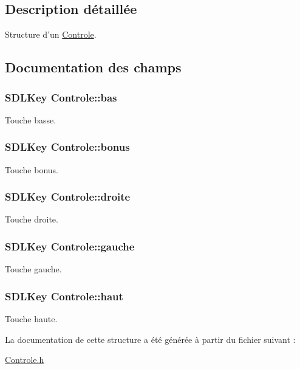 \subsection{Description détaillée}
Structure d'un \hyperlink{structControle}{Controle}. 

\subsection{Documentation des champs}
\hypertarget{structControle_a5b5c96bf02d58115b53eaa683f372faf}{
\subsubsection[{bas}]{\setlength{\rightskip}{0pt plus 5cm}S\-D\-L\-Key Controle\-::bas}}\label{structControle_a5b5c96bf02d58115b53eaa683f372faf}
Touche basse. \hypertarget{structControle_ad6ce9209cfccf9b61fbaf5bc149b64e9}{
\subsubsection[{bonus}]{\setlength{\rightskip}{0pt plus 5cm}S\-D\-L\-Key Controle\-::bonus}}\label{structControle_ad6ce9209cfccf9b61fbaf5bc149b64e9}
Touche bonus. \hypertarget{structControle_a1178797db7b9f5956c553feea90b828d}{
\subsubsection[{droite}]{\setlength{\rightskip}{0pt plus 5cm}S\-D\-L\-Key Controle\-::droite}}\label{structControle_a1178797db7b9f5956c553feea90b828d}
Touche droite. \hypertarget{structControle_ae86d63d5b63cd831f57ce8383d5488af}{
\subsubsection[{gauche}]{\setlength{\rightskip}{0pt plus 5cm}S\-D\-L\-Key Controle\-::gauche}}\label{structControle_ae86d63d5b63cd831f57ce8383d5488af}
Touche gauche. \hypertarget{structControle_a515a70782a9e7e6f5fbf9f99815b5ae2}{
\subsubsection[{haut}]{\setlength{\rightskip}{0pt plus 5cm}S\-D\-L\-Key Controle\-::haut}}\label{structControle_a515a70782a9e7e6f5fbf9f99815b5ae2}
Touche haute. 

La documentation de cette structure a été générée à partir du fichier suivant \-:\begin{DoxyCompactItemize}
\item 
\hyperlink{Controle_8h}{Controle.\-h}\end{DoxyCompactItemize}
